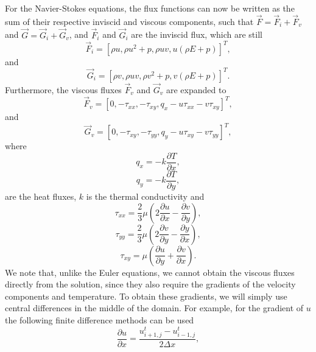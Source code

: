 For the Navier-Stokes equations, the flux functions can now be written as the sum of their respective inviscid and viscous components, such that $\vec{F} = \vec{F}_i + \vec{F}_v$ and $\vec{G} = \vec{G}_i + \vec{G}_v$, and $\vec{F}_i$ and $\vec{G}_i$ are the inviscid flux, which are still
\begin{equation}
	\vec{F}_i = [\rho u,\rho u^2 + p, \rho uv, u(\rho E+p)]^T,
\end{equation}
and
\begin{equation}
	\vec{G}_i = [\rho v,\rho u v, \rho v^2+p, v(\rho E+p)]^T.
\end{equation}
Furthermore, the viscous fluxes $\vec{F}_v$ and $\vec{G}_v$ are expanded to
\begin{equation}
	\vec{F}_v = [0,-\tau_{xx}, -\tau_{xy}, q_x-u\tau_{xx}-v\tau_{xy}]^T,
\end{equation}
and
\begin{equation}
	\vec{G}_v = [0,-\tau_{xy}, -\tau_{yy}, q_y-u\tau_{xy}-v\tau_{yy}]^T,
\end{equation}
where 
\begin{equation}
	q_x = -k \frac{\partial T}{\partial x},
\end{equation} 
\begin{equation}
 q_y = -k \frac{\partial T}{\partial y},
\end{equation} 
are the heat fluxes, $k$ is the thermal conductivity and
\begin{equation}
	\tau_{xx} = \frac{2}{3}\mu\left(2 \frac{\partial u}{\partial x} - \frac{\partial v}{\partial y} \right),
\end{equation}
\begin{equation}
	\tau_{yy} = \frac{2}{3}\mu\left(2 \frac{\partial v}{\partial y} - \frac{\partial y}{\partial x} \right),
\end{equation}
\begin{equation}
	\tau_{xy} = \mu \left(\frac{\partial u}{\partial y} + \frac{\partial v}{\partial x}\right).
\end{equation}
We note that, unlike the Euler equations, we cannot obtain the viscous fluxes directly from the solution, since they also require the gradients of the velocity components and temperature. To obtain these gradients, we will simply use central differences in the middle of the domain. For example, for the gradient of $u$ the following finite difference methods can be used
\begin{equation}
	\frac{\partial u}{\partial x} = \frac{u_{i+1,j}^t - u_{i-1,j}^t}{2 \Delta x},
\end{equation}
